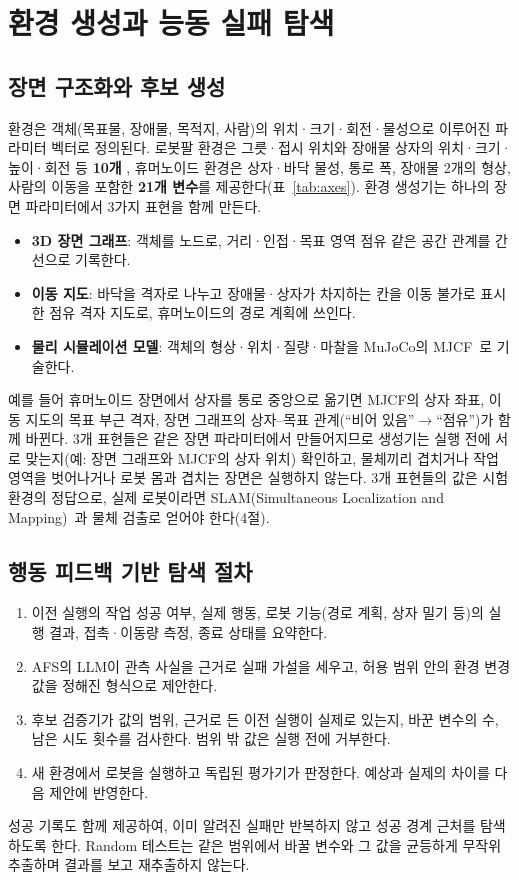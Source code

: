 \section{환경 생성과 능동 실패 탐색}

\subsection*{장면 구조화와 후보 생성}
환경은 객체(목표물, 장애물, 목적지, 사람)의 위치·크기·회전·물성으로 이루어진 파라미터 벡터로 정의된다. 
로봇팔 환경은 그릇·접시 위치와 장애물 상자의 위치·크기·높이·회전 등 \textbf{10개 }, 
휴머노이드 환경은 상자·바닥 물성, 통로 폭, 장애물 2개의 형상, 사람의 이동을 포함한 \textbf{21개 변수}를 제공한다(표~\ref{tab:axes}). 
환경 생성기는 하나의 장면 파라미터에서 3가지 표현을 함께 만든다.
\begin{itemize}
\item \textbf{3D 장면 그래프}: 객체를 노드로, 거리·인접·목표 영역 점유 같은 공간 관계를 간선으로 기록한다.
\item \textbf{이동 지도}: 바닥을 격자로 나누고 장애물·상자가 차지하는 칸을 이동 불가로 표시한 점유 격자 지도로, 휴머노이드의 경로 계획에 쓰인다.
\item \textbf{물리 시뮬레이션 모델}: 객체의 형상·위치·질량·마찰을 MuJoCo의 MJCF~\cite{mjcf}로 기술한다.
\end{itemize}
예를 들어 휴머노이드 장면에서 상자를 통로 중앙으로 옮기면 MJCF의 상자 좌표, 이동 지도의 목표 부근 격자,
장면 그래프의 상자–목표 관계(``비어 있음''$\to$``점유'')가 함께 바뀐다. 
3개 표현들은 같은 장면 파라미터에서 만들어지므로 생성기는 실행 전에 서로 맞는지(예: 장면 그래프와 MJCF의 상자 위치) 확인하고,
물체끼리 겹치거나 작업 영역을 벗어나거나 로봇 몸과 겹치는 장면은 실행하지 않는다. 3개 표현들의 값은 시험 환경의 정답으로, 실제 로봇이라면 SLAM(Simultaneous Localization and Mapping)~\cite{slam}과 물체 검출로 얻어야 한다(4절). 

\subsection*{행동 피드백 기반 탐색 절차}
\begin{enumerate}
\item 이전 실행의 작업 성공 여부, 실제 행동, 로봇 기능(경로 계획, 상자 밀기 등)의 실행 결과, 접촉·이동량 측정, 종료 상태를 요약한다.
\item AFS의 LLM이 관측 사실을 근거로 실패 가설을 세우고, 허용 범위 안의 환경 변경값을 정해진 형식으로 제안한다.
\item 후보 검증기가 값의 범위, 근거로 든 이전 실행이 실제로 있는지, 바꾼 변수의 수, 남은 시도 횟수를 검사한다. 범위 밖 값은 실행 전에 거부한다.
\item 새 환경에서 로봇을 실행하고 독립된 평가기가 판정한다. 예상과 실제의 차이를 다음 제안에 반영한다.
\end{enumerate}
성공 기록도 함께 제공하여, 이미 알려진 실패만 반복하지 않고 성공 경계 근처를 탐색하도록 한다.
Random 테스트는 같은 범위에서 바꿀 변수와 그 값을 균등하게 무작위 추출하며 결과를 보고 재추출하지 않는다.

